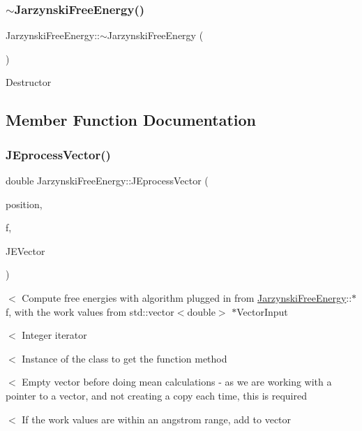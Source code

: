 \subsubsection{\texorpdfstring{$\sim$\+Jarzynski\+Free\+Energy()}{~JarzynskiFreeEnergy()}}
{\footnotesize\ttfamily Jarzynski\+Free\+Energy\+::$\sim$\+Jarzynski\+Free\+Energy (\begin{DoxyParamCaption}{ }\end{DoxyParamCaption})}

Destructor 

\subsection{Member Function Documentation}
\mbox{\label{classJarzynskiFreeEnergy_a08c0fc232cb17af249320c14a6c6d75e}} 
\subsubsection{\texorpdfstring{J\+Eprocess\+Vector()}{JEprocessVector()}}
{\footnotesize\ttfamily double Jarzynski\+Free\+Energy\+::\+J\+Eprocess\+Vector (\begin{DoxyParamCaption}\item[{int}]{position,  }\item[{double(Jarzynski\+Free\+Energy\+::$\ast$)(std\+::vector$<$ double $>$ $\ast$Vector\+Input)}]{f,  }\item[{std\+::vector$<$ double $>$ $\ast$}]{J\+E\+Vector }\end{DoxyParamCaption})}

$<$ Compute free energies with algorithm plugged in from \hyperlink{classJarzynskiFreeEnergy}{Jarzynski\+Free\+Energy}\+:\+:$\ast$f, with the work values from std\+::vector$<$double$>$ $\ast$\+Vector\+Input

$<$ Integer iterator

$<$ Instance of the class to get the function method

$<$ Empty vector before doing mean calculations -\/ as we are working with a pointer to a vector, and not creating a copy each time, this is required

$<$ If the work values are within an angstrom range, add to vector

